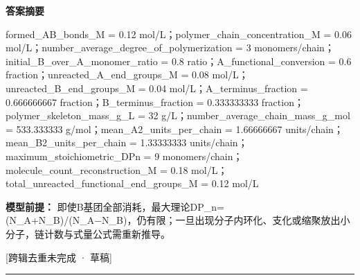 \documentclass[UTF8,11pt,a4paper]{ctexart}
\begin{document}
\noindent\textbf{答案摘要}\par
formed\_AB\_bonds\_M = 0.12 mol/L；polymer\_chain\_concentration\_M = 0.06 mol/L；number\_average\_degree\_of\_polymerization = 3 monomers/chain；initial\_B\_over\_A\_monomer\_ratio = 0.8 ratio；A\_functional\_conversion = 0.6 fraction；unreacted\_A\_end\_groups\_M = 0.08 mol/L；unreacted\_B\_end\_groups\_M = 0.04 mol/L；A\_terminus\_fraction = 0.666666667 fraction；B\_terminus\_fraction = 0.333333333 fraction；polymer\_skeleton\_mass\_g\_L = 32 g/L；number\_average\_chain\_mass\_g\_mol = 533.333333 g/mol；mean\_A2\_units\_per\_chain = 1.66666667 units/chain；mean\_B2\_units\_per\_chain = 1.33333333 units/chain；maximum\_stoichiometric\_DPn = 9 monomers/chain；molecule\_count\_reconstruction\_M = 0.18 mol/L；total\_unreacted\_functional\_end\_groups\_M = 0.12 mol/L\par
\noindent\textbf{模型前提：}
即使B基团全部消耗，最大理论DP\_n=(N\_A+N\_B)/(N\_A−N\_B)，仍有限；一旦出现分子内环化、支化或缩聚放出小分子，链计数与式量公式需重新推导。\par
\noindent\textcolor{red!65!black}{[跨辑去重未完成 · 草稿]} \par
\medskip\hrule\medskip
{}
\end{document}
